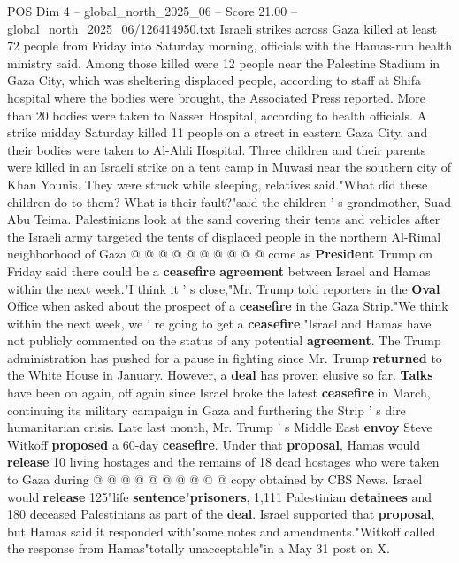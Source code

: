 \begin{textsample}{POS Dim 4 – global\_north\_2025\_06 – Score 21.00 – global\_north\_2025\_06/126414950.txt}  \label{ex:f4_pos_382}
Israeli strikes across Gaza killed at least 72 people from Friday into Saturday morning, officials with the Hamas-run health ministry said.
Among those killed were 12 people near the Palestine Stadium in Gaza City, which was sheltering displaced people, according to staff at Shifa hospital where the bodies were brought, the Associated Press reported.
More than 20 bodies were taken to Nasser Hospital, according to health officials.
A strike midday Saturday killed 11 people on a street in eastern Gaza City, and their bodies were taken to Al-Ahli Hospital.
Three children and their parents were killed in an Israeli strike on a tent camp in Muwasi near the southern city of Khan Younis.
They were struck while sleeping, relatives said."What did these children do to them?
What is their fault?"said the children ' s grandmother, Suad Abu Teima.
Palestinians look at the sand covering their tents and vehicles after the Israeli army targeted the tents of displaced people in the northern Al-Rimal neighborhood of Gaza @ @ @ @ @ @ @ @ @ @ come as \textbf{President} Trump on Friday said there could be a \textbf{ceasefire} \textbf{agreement} between Israel and Hamas within the next week."I think it ' s close,"Mr.
Trump told reporters in the \textbf{Oval} Office when asked about the prospect of a \textbf{ceasefire} in the Gaza Strip."We think within the next week, we ' re going to get a \textbf{ceasefire}."Israel and Hamas have not publicly commented on the status of any potential \textbf{agreement}.
The Trump administration has pushed for a pause in fighting since Mr.
Trump \textbf{returned} to the White House in January.
However, a \textbf{deal} has proven elusive so far. \textbf{Talks} have been on again, off again since Israel broke the latest \textbf{ceasefire} in March, continuing its military campaign in Gaza and furthering the Strip ' s dire humanitarian crisis.
Late last month, Mr.
Trump ' s Middle East \textbf{envoy} Steve Witkoff \textbf{proposed} a 60-day \textbf{ceasefire}.
Under that \textbf{proposal}, Hamas would \textbf{release} 10 living hostages and the remains of 18 dead hostages who were taken to Gaza during @ @ @ @ @ @ @ @ @ @ copy obtained by CBS News.
Israel would \textbf{release} 125"life \textbf{sentence}"\textbf{prisoners}, 1,111 Palestinian \textbf{detainees} and 180 deceased Palestinians as part of the \textbf{deal}.
Israel supported that \textbf{proposal}, but Hamas said it responded with"some notes and amendments."Witkoff called the response from Hamas"totally unacceptable"in a May 31 post on X.

\end{textsample}
